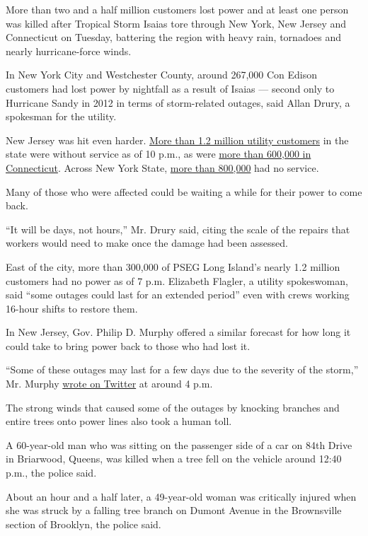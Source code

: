 More than two and a half million customers lost power and at least one
person was killed after Tropical Storm Isaias tore through New York, New
Jersey and Connecticut on Tuesday, battering the region with heavy rain,
tornadoes and nearly hurricane-force winds.

In New York City and Westchester County, around 267,000 Con Edison
customers had lost power by nightfall as a result of Isaias --- second
only to Hurricane Sandy in 2012 in terms of storm-related outages, said
Allan Drury, a spokesman for the utility.

New Jersey was hit even harder.
\href{https://poweroutage.us/area/state/new\%20jersey}{More than 1.2
million utility customers} in the state were without service as of 10
p.m., as were \href{https://poweroutage.us/area/state/connecticut}{more
than 600,000 in Connecticut}. Across New York State,
\href{https://poweroutage.us/area/state/new\%20york}{more than 800,000}
had no service.

Many of those who were affected could be waiting a while for their power
to come back.

``It will be days, not hours,'' Mr. Drury said, citing the scale of the
repairs that workers would need to make once the damage had been
assessed.

East of the city, more than 300,000 of PSEG Long Island's nearly 1.2
million customers had no power as of 7 p.m. Elizabeth Flagler, a utility
spokeswoman, said ``some outages could last for an extended period''
even with crews working 16-hour shifts to restore them.

In New Jersey, Gov. Philip D. Murphy offered a similar forecast for how
long it could take to bring power back to those who had lost it.

``Some of these outages may last for a few days due to the severity of
the storm,'' Mr. Murphy
\href{https://twitter.com/GovMurphy/status/1290742757275906049}{wrote on
Twitter} at around 4 p.m.

The strong winds that caused some of the outages by knocking branches
and entire trees onto power lines also took a human toll.

A 60-year-old man who was sitting on the passenger side of a car on 84th
Drive in Briarwood, Queens, was killed when a tree fell on the vehicle
around 12:40 p.m., the police said.

About an hour and a half later, a 49-year-old woman was critically
injured when she was struck by a falling tree branch on Dumont Avenue in
the Brownsville section of Brooklyn, the police said.

